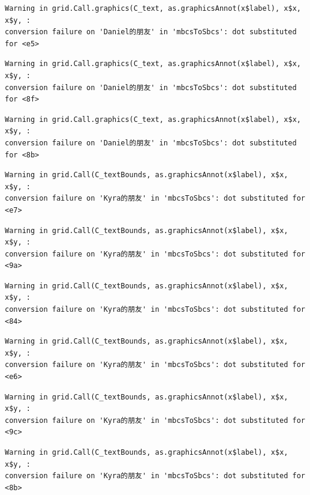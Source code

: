 \documentclass[
  letterpaper,
  DIV=11,
  numbers=noendperiod]{scrreprt}
\begin{document}
\begin{verbatim}
Warning in grid.Call.graphics(C_text, as.graphicsAnnot(x$label), x$x, x$y, :
conversion failure on 'Daniel的朋友' in 'mbcsToSbcs': dot substituted for <e5>
\end{verbatim}

\begin{verbatim}
Warning in grid.Call.graphics(C_text, as.graphicsAnnot(x$label), x$x, x$y, :
conversion failure on 'Daniel的朋友' in 'mbcsToSbcs': dot substituted for <8f>
\end{verbatim}

\begin{verbatim}
Warning in grid.Call.graphics(C_text, as.graphicsAnnot(x$label), x$x, x$y, :
conversion failure on 'Daniel的朋友' in 'mbcsToSbcs': dot substituted for <8b>
\end{verbatim}

\begin{verbatim}
Warning in grid.Call(C_textBounds, as.graphicsAnnot(x$label), x$x, x$y, :
conversion failure on 'Kyra的朋友' in 'mbcsToSbcs': dot substituted for <e7>
\end{verbatim}

\begin{verbatim}
Warning in grid.Call(C_textBounds, as.graphicsAnnot(x$label), x$x, x$y, :
conversion failure on 'Kyra的朋友' in 'mbcsToSbcs': dot substituted for <9a>
\end{verbatim}

\begin{verbatim}
Warning in grid.Call(C_textBounds, as.graphicsAnnot(x$label), x$x, x$y, :
conversion failure on 'Kyra的朋友' in 'mbcsToSbcs': dot substituted for <84>
\end{verbatim}

\begin{verbatim}
Warning in grid.Call(C_textBounds, as.graphicsAnnot(x$label), x$x, x$y, :
conversion failure on 'Kyra的朋友' in 'mbcsToSbcs': dot substituted for <e6>
\end{verbatim}

\begin{verbatim}
Warning in grid.Call(C_textBounds, as.graphicsAnnot(x$label), x$x, x$y, :
conversion failure on 'Kyra的朋友' in 'mbcsToSbcs': dot substituted for <9c>
\end{verbatim}

\begin{verbatim}
Warning in grid.Call(C_textBounds, as.graphicsAnnot(x$label), x$x, x$y, :
conversion failure on 'Kyra的朋友' in 'mbcsToSbcs': dot substituted for <8b>
\end{verbatim}
\end{document}
